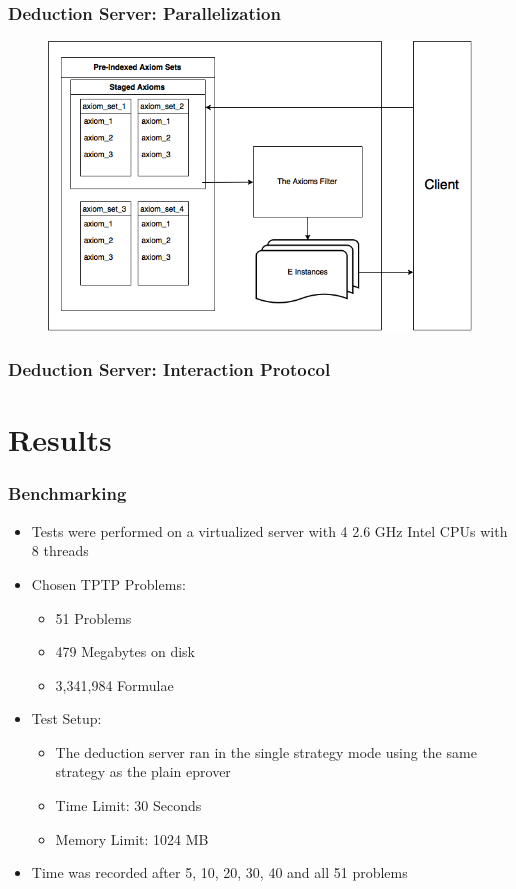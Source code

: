\documentclass[10pt]{beamer}
\begin{document}
\begin{frame}[fragile]
  \frametitle{Deduction Server: Parallelization}
    \begin{figure} \includegraphics[width=\linewidth,height=\textheight,keepaspectratio]{imgs/TheDeductionServer.png} \end{figure}
\end{frame}

\begin{frame}[fragile]
  \frametitle{Deduction Server: Interaction Protocol}
\end{frame}

\section{Results}
\begin{frame}[fragile]
  \frametitle{Benchmarking}
  \begin{itemize}[<+- | alert@+>]
    \item Tests were performed on a virtualized server with 4 2.6 GHz Intel CPUs with 8 threads
    \item Chosen TPTP Problems:
      \begin{itemize}
        \item 51 Problems
        \item 479 Megabytes on disk
        \item 3,341,984 Formulae
      \end{itemize}
    \item Test Setup:
      \begin{itemize}
        \item The deduction server ran in the single strategy mode using the same strategy as the plain eprover
        \item Time Limit: 30 Seconds
        \item Memory Limit: 1024 MB
      \end{itemize}
    \item Time was recorded after 5, 10, 20, 30, 40 and all 51 problems
  \end{itemize}
\end{frame}
\end{document}
